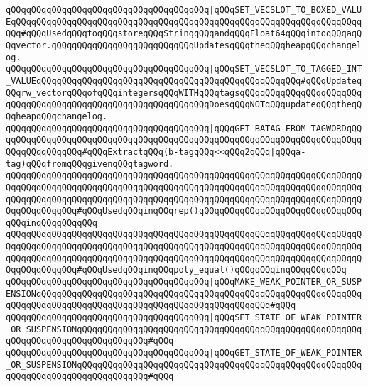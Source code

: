 \verb|qQQqqQQqqQQqqQQqqQQqqQQqqQQqqQQqqQQqqQQq|\verb#|qQQqSET_VECSLOT_TO_BOXED_VALUEqQQqqQQqqQQqqQQqqQQqqQQqqQQqqQQqqQQqqQQqqQQqqQQqqQQqqQQqqQQqqQQqqQQqqQQq#\verb|#qQQqUsedqQQqtoqQQqstoreqQQqStringqQQqandqQQqFloat64qQQqintoqQQqaqQQqvector.qQQqqQQqqQQqqQQqqQQqqQQqqQQqUpdatesqQQqtheqQQqheapqQQqchangelog.|\newline
\verb|qQQqqQQqqQQqqQQqqQQqqQQqqQQqqQQqqQQqqQQq|\verb#|qQQqSET_VECSLOT_TO_TAGGED_INT_VALUEqQQqqQQqqQQqqQQqqQQqqQQqqQQqqQQqqQQqqQQqqQQqqQQqqQQq#\verb|#qQQqUpdateqQQqrw_vectorqQQqofqQQqintegersqQQqWITHqQQqtagsqQQqqQQqqQQqqQQqqQQqqQQqqQQqqQQqqQQqqQQqqQQqqQQqqQQqqQQqqQQqqQQqDoesqQQqNOTqQQqupdateqQQqtheqQQqheapqQQqchangelog.|\newline
\newline
\verb|qQQqqQQqqQQqqQQqqQQqqQQqqQQqqQQqqQQqqQQq|\verb#|qQQqGET_BATAG_FROM_TAGWORDqQQqqQQqqQQqqQQqqQQqqQQqqQQqqQQqqQQqqQQqqQQqqQQqqQQqqQQqqQQqqQQqqQQqqQQqqQQqqQQqqQQqqQQq#\verb|#qQQqExtractqQQq(b-tagqQQq<<qQQq2qQQq|\verb#|qQQqa-tag)qQQqfromqQQqgivenqQQqtagword.#\newline
\verb|qQQqqQQqqQQqqQQqqQQqqQQqqQQqqQQqqQQqqQQqqQQqqQQqqQQqqQQqqQQqqQQqqQQqqQQqqQQqqQQqqQQqqQQqqQQqqQQqqQQqqQQqqQQqqQQqqQQqqQQqqQQqqQQqqQQqqQQqqQQqqQQqqQQqqQQqqQQqqQQqqQQqqQQqqQQqqQQqqQQqqQQqqQQqqQQqqQQqqQQqqQQqqQQqqQQqqQQqqQQqqQQq#qQQqUsedqQQqinqQQqrep()qQQqqQQqqQQqqQQqqQQqqQQqqQQqqQQqqQQqinqQQqqQQqqQQq|\newline
\verb|qQQqqQQqqQQqqQQqqQQqqQQqqQQqqQQqqQQqqQQqqQQqqQQqqQQqqQQqqQQqqQQqqQQqqQQqqQQqqQQqqQQqqQQqqQQqqQQqqQQqqQQqqQQqqQQqqQQqqQQqqQQqqQQqqQQqqQQqqQQqqQQqqQQqqQQqqQQqqQQqqQQqqQQqqQQqqQQqqQQqqQQqqQQqqQQqqQQqqQQqqQQqqQQqqQQqqQQqqQQqqQQq#qQQqUsedqQQqinqQQqpoly_equal()qQQqqQQqinqQQqqQQqqQQq|\newline
\newline
\verb|qQQqqQQqqQQqqQQqqQQqqQQqqQQqqQQqqQQqqQQq|\verb#|qQQqMAKE_WEAK_POINTER_OR_SUSPENSIONqQQqqQQqqQQqqQQqqQQqqQQqqQQqqQQqqQQqqQQqqQQqqQQqqQQqqQQqqQQqqQQqqQQqqQQqqQQqqQQqqQQqqQQqqQQqqQQqqQQqqQQqqQQqqQQqqQQq#\verb|#qQQq|\newline
\verb|qQQqqQQqqQQqqQQqqQQqqQQqqQQqqQQqqQQqqQQq|\verb#|qQQqSET_STATE_OF_WEAK_POINTER_OR_SUSPENSIONqQQqqQQqqQQqqQQqqQQqqQQqqQQqqQQqqQQqqQQqqQQqqQQqqQQqqQQqqQQqqQQqqQQqqQQqqQQqqQQqqQQq#\verb|#qQQq|\newline
\verb|qQQqqQQqqQQqqQQqqQQqqQQqqQQqqQQqqQQqqQQq|\verb#|qQQqGET_STATE_OF_WEAK_POINTER_OR_SUSPENSIONqQQqqQQqqQQqqQQqqQQqqQQqqQQqqQQqqQQqqQQqqQQqqQQqqQQqqQQqqQQqqQQqqQQqqQQqqQQqqQQqqQQq#\verb|#qQQq|\newline
